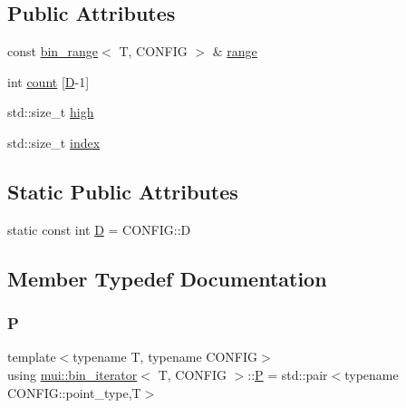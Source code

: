 \subsection*{Public Attributes}
\begin{DoxyCompactItemize}
\item 
const \hyperlink{structmui_1_1bin__range}{bin\+\_\+range}$<$ T, C\+O\+N\+F\+IG $>$ \& \hyperlink{structmui_1_1bin__iterator_a371e739fe4b63c447a787572eb8ed055}{range}
\item 
int \hyperlink{structmui_1_1bin__iterator_a97ebdd9e81da980a9a455eef380ebf6f}{count} \mbox{[}\hyperlink{structmui_1_1bin__iterator_acb6d849efa422c9c07a5866c3031a3f8}{D}-\/1\mbox{]}
\item 
std\+::size\+\_\+t \hyperlink{structmui_1_1bin__iterator_ac6914757b751e94ba6763d82faabbc2c}{high}
\item 
std\+::size\+\_\+t \hyperlink{structmui_1_1bin__iterator_a78c714939432311507baacc85de506e4}{index}
\end{DoxyCompactItemize}
\subsection*{Static Public Attributes}
\begin{DoxyCompactItemize}
\item 
static const int \hyperlink{structmui_1_1bin__iterator_acb6d849efa422c9c07a5866c3031a3f8}{D} = C\+O\+N\+F\+I\+G\+::D
\end{DoxyCompactItemize}


\subsection{Member Typedef Documentation}
\mbox{\label{structmui_1_1bin__iterator_a647b888410c7aec82b750400f5d5c283}} 
\subsubsection{\texorpdfstring{P}{P}}
{\footnotesize\ttfamily template$<$typename T, typename C\+O\+N\+F\+IG$>$ \\
using \hyperlink{structmui_1_1bin__iterator}{mui\+::bin\+\_\+iterator}$<$ T, C\+O\+N\+F\+IG $>$\+::\hyperlink{structmui_1_1bin__iterator_a647b888410c7aec82b750400f5d5c283}{P} =  std\+::pair$<$typename C\+O\+N\+F\+I\+G\+::point\+\_\+type,T$>$}



